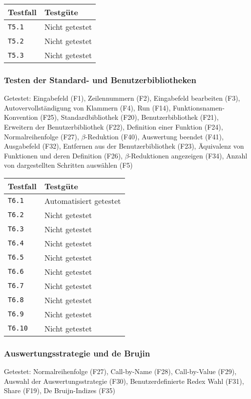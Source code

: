 \documentclass[parskip=full,11pt,twoside]{scrartcl}
\newcommand{\testline}[2]{
    \texttt{#1} & 
    \ifthenelse{\equal{#2}{Nicht getestet}}
        {\cellcolor{red!20}}
        {}
    \ifthenelse{\equal{#2}{Manuell getestet}}
        {\cellcolor{LimeGreen!20}}
        {}
    \ifthenelse{\equal{#2}{Automatisiert getestet}}
        {\cellcolor{green!20}}
        {}
    #2 \\ \hline
}
\begin{document}
    \label{shortcuts}
    \begin{center}
        \begin{tabular}{ p{9cm} p{4cm}}
            Testfall & Testgüte \\ \hline
            \testline{T5.1}{Nicht getestet}
            \testline{T5.2}{Nicht getestet}
            \testline{T5.3}{Nicht getestet}
        \end{tabular}
    \end{center}

\subsubsection{Testen der Standard- und Benutzerbibliotheken}
    Getestet:
    Eingabefeld (F1),
    Zeilennummern (F2),
    Eingabefeld bearbeiten (F3),
    Autovervollständigung von Klammern (F4),
    Run (F14),
    Funktionsnamen-Konvention (F25),
    Standardbibliothek (F20),
    Benutzerbibliothek (F21),
    Erweitern der Benutzerbibliothek (F22),
    Definition einer Funktion (F24),
    Normalreihenfolge (F27),
    $\beta$-Reduktion (F40),
    Auswertung beendet (F41),
    Ausgabefeld (F32),
    Entfernen aus der Benutzerbibliothek (F23),
    Äquivalenz von Funktionen und deren Definition (F26),
    $\beta$-Reduktionen angezeigen (F34),
    Anzahl von dargestellten Schritten auswählen (F5)

    \label{shortcuts}
    \begin{center}
        \begin{tabular}{ p{9cm} p{4cm}}
            Testfall & Testgüte \\ \hline
            \testline{T6.1}{Automatisiert getestet}
            \testline{T6.2}{Nicht getestet}
            \testline{T6.3}{Nicht getestet}
            \testline{T6.4}{Nicht getestet}
            \testline{T6.5}{Nicht getestet}
            \testline{T6.6}{Nicht getestet}
            \testline{T6.7}{Nicht getestet}
            \testline{T6.8}{Nicht getestet}
            \testline{T6.9}{Nicht getestet}
            \testline{T6.10}{Nicht getestet}
        \end{tabular}
    \end{center}

\subsubsection{Auswertungsstrategie und de Brujin}
    Getestet:
    Normalreihenfolge (F27),
    Call-by-Name (F28),
    Call-by-Value (F29),
    Auswahl der Auswertungsstrategie (F30),
    Benutzerdefinierte Redex Wahl (F31),
    Share (F19),
    De Bruijn-Indizes (F35)
\end{document}
